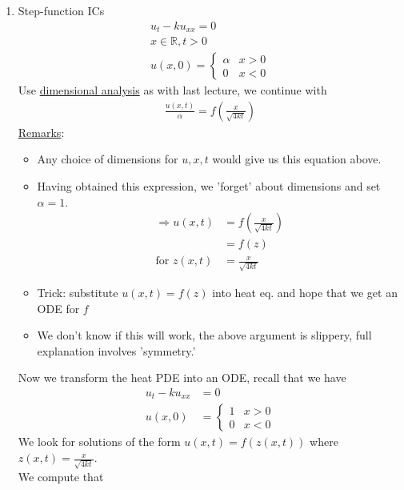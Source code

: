 \documentclass[12pt, letterpaper]{article}
\begin{document}
\begin{enumerate}
    \item Step-function ICs
    \begin{align*}
        u_t - ku_{xx} = 0 \\
        x \in \mathbb{R}, t > 0  \\
        u(x,0) = \begin{cases}
            \alpha & x > 0 \\
            0 & x < 0
        \end{cases}
    \end{align*}
    Use \underline{dimensional analysis} as with last lecture, we continue with 
    \begin{align*}
        \frac{u(x,t)}{\alpha} = f\left(\frac{x}{\sqrt{4kt}}\right) 
    \end{align*}
    \underline{Remarks}:
    \begin{itemize}
        \item Any choice of dimensions for $u, x, t$ would give us this equation above.
        \item Having obtained this expression, we 'forget' about dimensions and set $\alpha = 1$.
        \begin{align*}
            \Rightarrow u(x,t) &= f\left(\frac{x}{\sqrt{4kt}}\right) \\
            &= f(z) \\
            \text{for } z(x,t) &= \frac{x}{\sqrt{4kt}}
        \end{align*}
        \item Trick: substitute $u(x,t) = f(z)$ into heat eq. and hope that we get an ODE for $f$
        \item We don't know if this will work, the above argument is slippery, full explanation 
        involves 'symmetry.'
    \end{itemize}
    Now we transform the heat PDE into an ODE, recall that we have 
    \begin{align*}
        u_t - ku_{xx} &= 0 \\
        u(x,0) &= \begin{cases}
            1 & x > 0 \\
            0 & x < 0
        \end{cases}
    \end{align*}
    We look for solutions of the form $u(x,t) = f(z(x,t))$ where 
    $z(x,t) = \displaystyle\frac{x}{\sqrt{4kt}}$.\\ 
    We compute that 
    \begin{align*}

\end{align*}
\end{enumerate}
\end{document}
